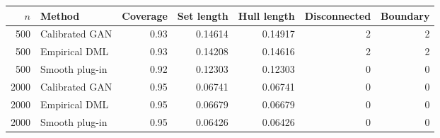 \begin{tabular}{rlrrrrr}
\toprule
$n$ & Method & Coverage & Set length & Hull length & Disconnected & Boundary \\
\midrule
500 & Calibrated GAN & 0.93 & 0.14614 & 0.14917 & 2 & 2 \\
500 & Empirical DML & 0.93 & 0.14208 & 0.14616 & 2 & 2 \\
500 & Smooth plug-in & 0.92 & 0.12303 & 0.12303 & 0 & 0 \\
2000 & Calibrated GAN & 0.95 & 0.06741 & 0.06741 & 0 & 0 \\
2000 & Empirical DML & 0.95 & 0.06679 & 0.06679 & 0 & 0 \\
2000 & Smooth plug-in & 0.95 & 0.06426 & 0.06426 & 0 & 0 \\
\bottomrule
\end{tabular}
